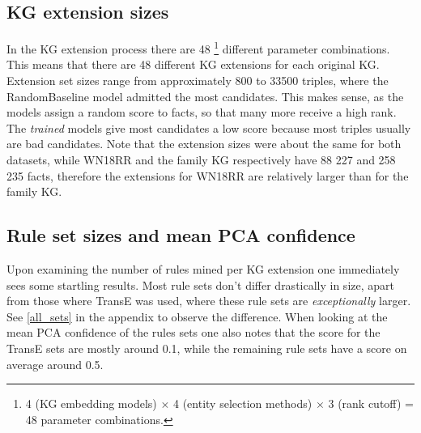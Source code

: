 \subsection{KG extension sizes}
In the KG extension process there are 48 \footnote{4 (KG embedding models) $\times$ 4 (entity selection methods) $\times$ 3 (rank cutoff) = 48 parameter combinations.} different parameter combinations. This means that there are 48 different KG extensions for each original KG. Extension set sizes range from approximately 800 to 33500 triples, where the RandomBaseline model admitted the most candidates. This makes sense, as the models assign a random score to facts, so that many more receive a high rank. The \textit{trained} models give most candidates a low score because most triples usually are bad candidates. Note that the extension sizes were about the same for both datasets, while WN18RR and the family KG respectively have 88 227 and 258 235 facts, therefore the extensions for WN18RR are relatively larger than for the family KG.

\subsection{Rule set sizes and mean PCA confidence}
\label{TransE_sucks} 
Upon examining the number of rules mined per KG extension one immediately sees some startling results. Most rule sets don't differ drastically in size, apart from those where TransE was used, where these rule sets are \textit{exceptionally} larger. See \cref{all_sets} in the appendix to observe the difference. When looking at the mean PCA confidence of the rules sets one also notes that the score for the TransE sets are mostly around 0.1, while the remaining rule sets have a score on average around 0.5.

